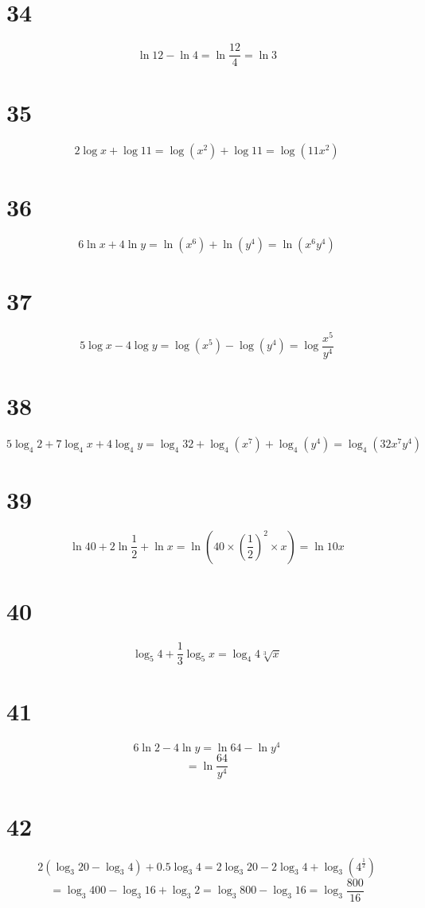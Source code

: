\documentclass{article}
\theoremstyle{definition}
\newcommand{\?}{\stackrel{?}{=}}
\begin{document}
\section*{34}
\[ \ln 12-\ln 4=\ln\frac{12}{4}=\ln 3 \]

\section*{35}
\[ 2\log x+\log 11=\log \left(x^2\right)+\log 11=\log \left(11x^2\right) \]

\section*{36}
\[ 6\ln x+4\ln y=\ln \left(x^6\right)+\ln\left(y^4\right)=\ln\left(x^6y^4\right) \]

\section*{37}
\[ 5\log x-4\log y=\log\left(x^5\right)-\log\left(y^4\right)=\log\frac{x^5}{y^4} \]

\section*{38}
\[ 5\log_4 2+7\log_4 x+4\log_4 y=\log_4 32+\log_4\left(x^7\right)+\log_4\left(y^4\right)=\log_4\left(32x^7y^4\right) \]

\section*{39}
\[ \ln 40+2\ln \frac{1}{2}+\ln x=\ln (40\times\left( \frac{1}{2}\right)^2\times x)=\ln 10x \]

\section*{40}
\[ \log_5 4+\frac{1}{3}\log_5 x=\log_4 4\sqrt[3]{x} \]

\section*{41}
\[ 6\ln 2-4\ln y=\ln 64-\ln y^4 \] \[ =\ln\frac{64}{y^4} \]

\section*{42}
\[ 2(\log_3 20-\log_3 4)+0.5\log_3 4=2\log_3 20-2\log_3 4+\log_3 \left( 4^\frac{1}{2}\right) \]
\[ =\log_3 400-\log_3 16+\log_3 2=\log_3 800-\log_3 16=\log_3\dfrac{800}{16} \]
\end{document}
